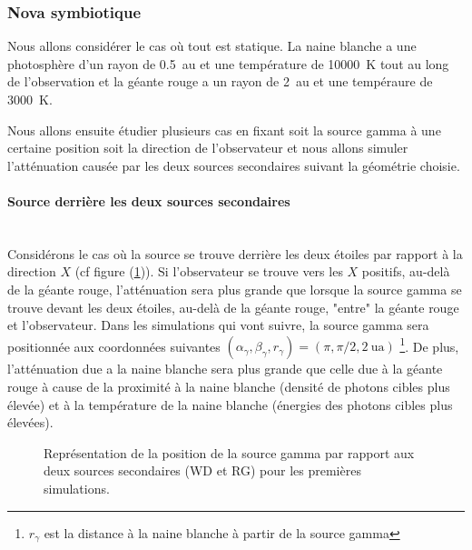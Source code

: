 \documentclass[a4paper,12pt,twoside]{article}
\begin{document}
\subsubsection{Nova symbiotique}\label{sec: nova symbiotique}

Nous allons considérer le cas où tout est statique. La naine blanche a une photosphère d'un rayon de \SI{0.5}{\astronomicalunit} et une température de \SI{10000}{\K} tout au long de l'observation et la géante rouge a un rayon de \SI{2}{\astronomicalunit} et une tempéraure de \SI{3000}{\K}.

Nous allons ensuite étudier plusieurs cas en fixant soit la source gamma à une certaine position soit la direction de l'observateur et nous allons simuler l'atténuation causée par les deux sources secondaires suivant la géométrie choisie.

\paragraph*{Source derrière les deux sources secondaires} \hspace{0pt} \\

Considérons le cas où la source se trouve derrière les deux étoiles par rapport à la direction $X$ (cf figure (\ref{fig: simu1})). Si l'observateur se trouve vers les $X$ positifs, au-delà de la géante rouge, l'atténuation sera plus grande que lorsque la source gamma se trouve devant les deux étoiles, au-delà de la géante rouge, "entre" la géante rouge et l'observateur. Dans les simulations qui vont suivre, la source gamma sera positionnée aux coordonnées suivantes $(\alpha_\gamma, \beta_\gamma, r_\gamma) = (\pi, \pi/2, \SI{2}{\astronomicalunit})$ \footnote{$r_\gamma$ est la distance à la naine blanche à partir de la source gamma}. De plus, l'atténuation due a la naine blanche sera plus grande que celle due à la géante rouge à cause de la proximité à la naine blanche (densité de photons cibles plus élevée) et à la température de la naine blanche (énergies des photons cibles plus élevées).
\begin{figure}[H]
	\centering
    \caption{Représentation de la position de la source gamma par rapport aux deux sources secondaires (WD et RG) pour les premières simulations.}
    \label{fig: simu1}
\end{figure}
\end{document}
